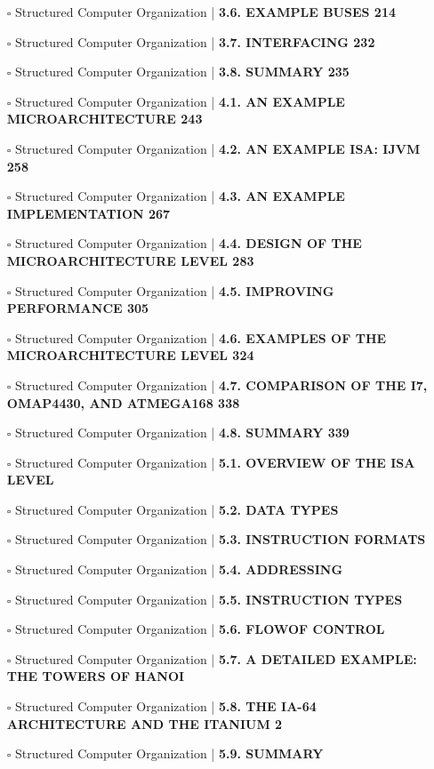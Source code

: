 \documentclass[a4, landscape, 12pt]{article}
\newcommand{\checkbox}{$\square$}%
\begin{document}
\begin{itemize}
{}
\item [\checkbox]  Structured Computer Organization | \textbf{ 3.6. EXAMPLE BUSES 214
}
\item [\checkbox]  Structured Computer Organization | \textbf{ 3.7. INTERFACING 232
}
\item [\checkbox]  Structured Computer Organization | \textbf{ 3.8. SUMMARY 235
}
\item [\checkbox]  Structured Computer Organization | \textbf{ 4.1. AN EXAMPLE MICROARCHITECTURE 243
}
\item [\checkbox]  Structured Computer Organization | \textbf{ 4.2. AN EXAMPLE ISA: IJVM 258
}
\item [\checkbox]  Structured Computer Organization | \textbf{ 4.3. AN EXAMPLE IMPLEMENTATION 267
}
\item [\checkbox]  Structured Computer Organization | \textbf{ 4.4. DESIGN OF THE MICROARCHITECTURE LEVEL 283
}
\item [\checkbox]  Structured Computer Organization | \textbf{ 4.5. IMPROVING PERFORMANCE 305
}
\item [\checkbox]  Structured Computer Organization | \textbf{ 4.6. EXAMPLES OF THE MICROARCHITECTURE LEVEL 324
}
\item [\checkbox]  Structured Computer Organization | \textbf{ 4.7. COMPARISON OF THE I7, OMAP4430, AND ATMEGA168 338
}
\item [\checkbox]  Structured Computer Organization | \textbf{ 4.8. SUMMARY 339
}
\item [\checkbox]  Structured Computer Organization | \textbf{ 5.1. OVERVIEW OF THE ISA LEVEL
}
\item [\checkbox]  Structured Computer Organization | \textbf{ 5.2. DATA TYPES
}
\item [\checkbox]  Structured Computer Organization | \textbf{ 5.3. INSTRUCTION FORMATS
}
\item [\checkbox]  Structured Computer Organization | \textbf{ 5.4. ADDRESSING
}
\item [\checkbox]  Structured Computer Organization | \textbf{ 5.5. INSTRUCTION TYPES
}
\item [\checkbox]  Structured Computer Organization | \textbf{ 5.6. FLOWOF CONTROL
}
\item [\checkbox]  Structured Computer Organization | \textbf{ 5.7. A DETAILED EXAMPLE: THE TOWERS OF HANOI
}
\item [\checkbox]  Structured Computer Organization | \textbf{ 5.8. THE IA-64 ARCHITECTURE AND THE ITANIUM 2
}
\item [\checkbox]  Structured Computer Organization | \textbf{ 5.9. SUMMARY
}
\end{itemize}
\end{document}

